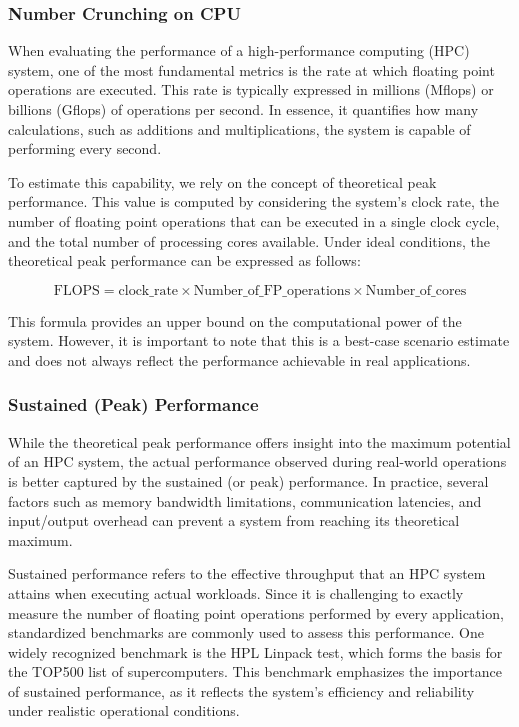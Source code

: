 \subsubsection{Number Crunching on CPU} \label{sec:number_crunching}

When evaluating the performance of a high-performance computing (HPC) system, one of the most fundamental metrics is the rate at which floating point operations are executed. This rate is typically expressed in millions (Mflops) or billions (Gflops) of operations per second. In essence, it quantifies how many calculations, such as additions and multiplications, the system is capable of performing every second.

To estimate this capability, we rely on the concept of theoretical peak performance. This value is computed by considering the system’s clock rate, the number of floating point operations that can be executed in a single clock cycle, and the total number of processing cores available. Under ideal conditions, the theoretical peak performance can be expressed as follows:

$$
\text{FLOPS} = \text{clock\_rate} \times \text{Number\_of\_FP\_operations} \times \text{Number\_of\_cores}
$$

This formula provides an upper bound on the computational power of the system. However, it is important to note that this is a best-case scenario estimate and does not always reflect the performance achievable in real applications.

\subsubsection{Sustained (Peak) Performance} \label{sec:sustained}

While the theoretical peak performance offers insight into the maximum potential of an HPC system, the actual performance observed during real-world operations is better captured by the sustained (or peak) performance. In practice, several factors such as memory bandwidth limitations, communication latencies, and input/output overhead can prevent a system from reaching its theoretical maximum.

Sustained performance refers to the effective throughput that an HPC system attains when executing actual workloads. Since it is challenging to exactly measure the number of floating point operations performed by every application, standardized benchmarks are commonly used to assess this performance. One widely recognized benchmark is the HPL Linpack test, which forms the basis for the TOP500 list of supercomputers. This benchmark emphasizes the importance of sustained performance, as it reflects the system’s efficiency and reliability under realistic operational conditions.

